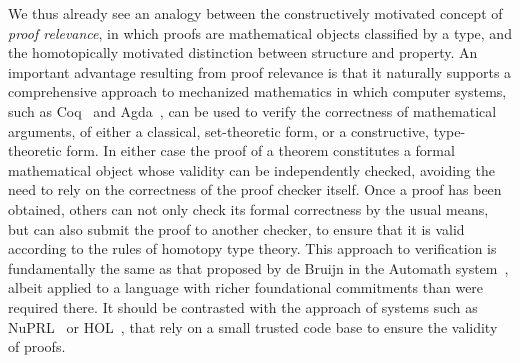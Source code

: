\documentclass[11pt]{article}
\begin{document}
We thus already see an analogy between the constructively motivated concept of \emph{proof relevance}, in which proofs
are mathematical objects classified by a type, and the homotopically motivated distinction between structure and property.  
An important advantage resulting from proof relevance is that it naturally 
supports a comprehensive approach to mechanized mathematics in which computer systems, such as Coq~\cite{Coq}
and Agda~\cite{Agda}, can be used to verify the correctness of mathematical arguments, of either a classical, set-theoretic
form, or a constructive, type-theoretic form.  In either case the proof of a theorem constitutes a formal mathematical
object whose validity can be independently checked, avoiding the need to rely on the correctness of the proof checker
itself.  Once a proof has been obtained, others can not only check its formal correctness by the usual means, but can also
submit the proof to another checker, to ensure that it is valid according to the
rules of homotopy type theory. 
This approach to verification is fundamentally the same as that proposed by de Bruijn in the Automath
system~\cite{Automath}, albeit applied to a language with richer foundational
commitments than were required there.
It should be contrasted with the approach of systems such as NuPRL~\cite{NuPRL-Site} or HOL~\cite{HOL,HOL-Light}, that rely
on a small trusted code base to ensure the validity of proofs.
\end{document}
